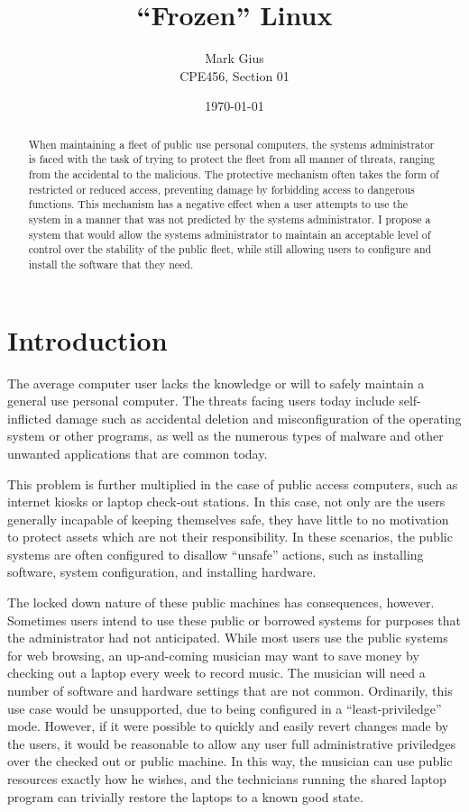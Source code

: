 \documentclass[12pt]{article}
\begin{document}
\title{``Frozen'' Linux}
\author{Mark Gius \\
        CPE456, Section 01}
\date{\today}
\maketitle

\begin{abstract}
When maintaining a fleet of public use personal computers, the systems
administrator is faced with the task of trying to protect the fleet from 
all manner of threats, ranging from the accidental to the malicious.  
The protective mechanism often takes the form of restricted or reduced 
access, preventing damage by forbidding access to dangerous functions.
This mechanism has a negative effect when a user attempts to use the system
in a manner that was not predicted by the systems administrator.
I propose a system that would allow the systems administrator to maintain
an acceptable level of control over the stability of the public fleet,
while still allowing users to configure and install the software that they
need.
\end{abstract}

\newpage
\doublespacing
\section{Introduction}
The average computer user lacks the knowledge or will to safely maintain 
a general use personal computer.  The threats facing users today include 
self-inflicted damage such as accidental deletion and misconfiguration of the 
operating system or other programs, as well as the numerous types of malware
and other unwanted applications that are common today.

This problem is further multiplied in the case of public access computers, 
such as internet kiosks or laptop check-out stations.  In this case, not 
only are the users generally incapable of keeping themselves safe, they have
little to no motivation to protect assets which are not their responsibility.
In these scenarios, the public systems are often configured to disallow 
``unsafe'' actions, such as installing software, system configuration, and
installing hardware.

The locked down nature of these public machines has consequences, however.
Sometimes users intend to use these public or borrowed systems for purposes
that the administrator had not anticipated.  While most users use the public
systems for web browsing, an up-and-coming musician may want to save money by
checking out a laptop every week to record music.  The musician will need a
number of software and hardware settings that are not common.  Ordinarily, this
use case would be unsupported, due to being configured in a
``least-priviledge'' mode.  However, if it were possible to quickly and easily
revert changes made by the users, it would be reasonable to allow any user full
administrative priviledges over the checked out or public machine.  In this
way, the musician can use public resources exactly how he wishes, and the
technicians running the shared laptop program can trivially restore the laptops
to a known good state.
\end{document}
